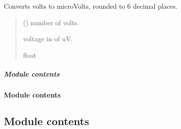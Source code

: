 \documentclass[letterpaper,10pt,english]{sphinxmanual}
\begin{document}
\begin{fulllineitems}
\begin{fulllineitems}
\label{\detokenize{PodApi.Stream.PodHandler:PodApi.Stream.PodHandler.HandlerInterface.DrainDeviceHandler._uV}}
\pysigstartsignatures
{}
\pysigstopsignatures
\sphinxAtStartPar
Converts volts to microVolts, rounded to 6 decimal places.
\begin{quote}\begin{description}
\sphinxAtStartPar
{} (\sphinxstyleliteralemphasis{\sphinxupquote{ | }}) \textendash{} number of volts.

\sphinxAtStartPar
voltage in of uV.

\sphinxAtStartPar
float

\end{description}\end{quote}

\end{fulllineitems}


\end{fulllineitems}



\subparagraph{Module contents}
\label{\detokenize{PodApi.Stream.PodHandler:module-PodApi.Stream.PodHandler}}\label{\detokenize{PodApi.Stream.PodHandler:module-contents}}

\paragraph{Module contents}
\label{\detokenize{PodApi.Stream:module-PodApi.Stream}}\label{\detokenize{PodApi.Stream:module-contents}}

\subsection{Module contents}
\label{\detokenize{PodApi:module-PodApi}}\label{\detokenize{PodApi:module-contents}}
\sphinxstepscope
\end{document}
